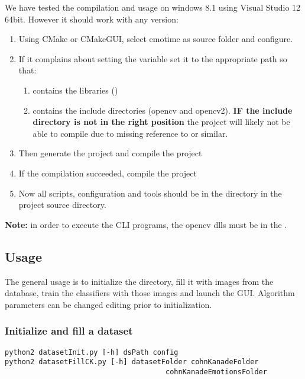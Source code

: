 We have tested the compilation and usage on windows 8.1 using Visual Studio 12
64bit. However it should work with any version:

\begin{enumerate}
  \item Using CMake or CMakeGUI, select emotime as source folder and configure.
  \item If it complains about setting the variable  set it to the appropriate path so that:
    \begin{enumerate}
      \item {} contains the libraries ()
      \item {} contains the include
        directories (opencv and opencv2). \textbf{IF the include directory is
        not in the right position} the project will likely not be able to
        compile due to missing reference to  or similar.
    \end{enumerate}
  \item Then generate the project and compile the project 
  \item If the compilation succeeded, compile the project 
  \item Now all scripts, configuration and tools should be in the directory
     in the project source directory.
\end{enumerate}

\textbf{Note:} in order to execute the CLI programs, the opencv dlls must be in
the .

\subsection{Usage}

The general usage is to initialize the  directory, fill it with
images from the  database, train the classifiers with those images and
launch the GUI\@. Algorithm parameters can be changed editing
 prior to initialization.

\subsubsection*{Initialize and fill a dataset}

\begin{verbatim}
python2 datasetInit.py [-h] dsPath config
python2 datasetFillCK.py [-h] datasetFolder cohnKanadeFolder
                                      cohnKanadeEmotionsFolder
\end{verbatim}

